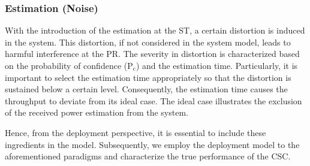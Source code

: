 \documentclass[draftcls, onecolumn, 11pt]{IEEEtran}
\newcommand{\sub}[1]{_{\text{#1}}}
\newcommand{\pc}{\text{P}\sub{c}}
\begin{document}
\subsubsection*{Estimation (Noise)}
With the introduction of the estimation at the ST,
a certain distortion is induced in the system. This distortion, if not considered in the system model, leads to harmful interference at the PR. 
The severity in distortion is characterized based on the probability of confidence ($\pc$) and the estimation time. Particularly, it is important to select the estimation time appropriately so that the distortion is sustained below a certain level. Consequently, the estimation time causes the throughput to deviate from its ideal case. The ideal case illustrates the exclusion of the received power estimation from the system. 

Hence, from the deployment perspective, it is essential to include these ingredients in the model. Subsequently, we employ the deployment model to the aforementioned paradigms and characterize the true performance of the CSC. 

\end{document}
